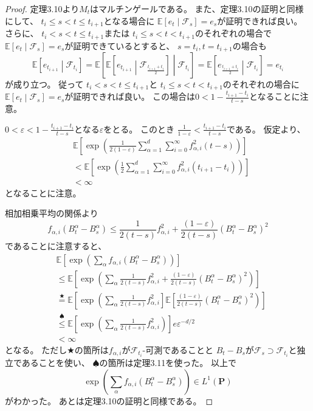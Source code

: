 \documentclass[uplatex]{jsarticle}
\theoremstyle{definition}
\def\ep{\varepsilon}
\def\P{\mathbf{P}}
\def\E{\mathbb{E}}
\def\mcF{\mathcal{F}}
\begin{document}
\begin{proof}
  定理3.10より\(M_t\)はマルチンゲールである。
  また、定理3.10の証明と同様にして、
  \(t_i \leq s < t \leq t_{i+1}\)となる場合に
  \(\E\left[e_t\middle| \mcF_s\right] = e_s\)が証明できれば良い。
  さらに、
  \(t_i < s < t \leq t_{i+1}\)または
  \(t_i \leq s < t < t_{i+1}\)のそれぞれの場合で
  \(\E\left[e_t\middle| \mcF_s\right] = e_s\)が証明できているとすると、
  \(s=t_i,t=t_{i+1}\)の場合も
  \[
  \E\left[e_{t_{i+1}}\middle| \mcF_{t_i}\right]
  = \E\left[\E\left[e_{t_{i+1}} \middle|
  \mcF_{\frac{t_{i+1}+t_i}{2}}\right]\middle| \mcF_{t_i}\right]
  = \E\left[e_{\frac{t_{i+1}+t_i}{2}} \middle| \mcF_{t_i}\right]
  = e_{t_i}
  \]
  が成り立つ。
  従って
  \(t_i < s < t \leq t_{i+1}\)と
  \(t_i \leq s < t < t_{i+1}\)のそれぞれの場合に
  \(\E\left[e_t\middle| \mcF_s\right] = e_s\)が証明できれば良い。
  この場合は\(0 < 1-\frac{t_{i+1}-t_i}{t-s}\)となることに注意。


  \(0< \ep < 1 - \frac{t_{i+1}-t_i}{t-s}\)となる\(\ep\)をとる。
  このとき
  \(\frac{1}{1-\ep} < \frac{t_{i+1}-t_i}{t-s}\)である。
  仮定より、
  \begin{align*}
    &\E\left[ \exp\left( \frac{1}{2(1-\ep)}\sum_{\alpha=1}^d\sum_{i=0}^\infty
    f_{\alpha,i}^2(t-s) \right)\right] \\
    &< \E\left[ \exp\left( \frac{1}{2}\sum_{\alpha=1}^d\sum_{i=0}^\infty
    f_{\alpha,i}^2(t_{i+1} - t_i) \right)\right] \\
    &< \infty
  \end{align*}
  となることに注意。

  相加相乗平均の関係より
  \[
  f_{\alpha,i}(B_t^\alpha-B_s^\alpha) \leq
  \frac{1}{2(t-s)}f_{\alpha,i}^2
  + \frac{(1-\ep)}{2(t-s)}(B_t^\alpha-B_s^\alpha)^2
  \]
  であることに注意すると、
  \begin{align*}
    &\E\left[ \exp \left(
    \sum_\alpha f_{\alpha,i}(B_t^\alpha-B_s^\alpha) \right)\right] \\
    &\leq \E\left[ \exp \left( \sum_\alpha \frac{1}{2(t-s)}f_{\alpha,i}^2 +
    \frac{(1-\ep)}{2(t-s)}(B_t^\alpha-B_s^\alpha)^2 \right)\right] \\
    &\overset{\bigstar}{=}
    \E\left[ \exp \left( \sum_\alpha \frac{1}{2(t-s)}f_{\alpha,i}^2\right]
    \E\left[ \frac{(1-\ep)}{2(t-s)}(B_t^\alpha-B_s^\alpha)^2 \right)\right] \\
    &\overset{\spadesuit}{\leq}
    \E\left[ \exp \left( \sum_\alpha \frac{1}{2(t-s)}f_{\alpha,i}^2\right) \right]
    e \ep ^{-d/2} \\
    &< \infty
  \end{align*}
  となる。
  ただし\(\bigstar\)の箇所は\(f_{\alpha,i}\)が\(\mcF_{t_i}\)-可測であることと
  \(B_t-B_s\)が\(\mcF_s \supset \mcF_{t_i}\)と独立であることを使い、
  \(\spadesuit\)の箇所は定理3.11を使った。
  以上で
  \[
  \exp \left( \sum_\alpha f_{\alpha,i}(B_t^\alpha-B_s^\alpha) \right)\in L^1(\P)
  \]
  がわかった。
  あとは定理3.10の証明と同様である。
\end{proof}
\end{document}
